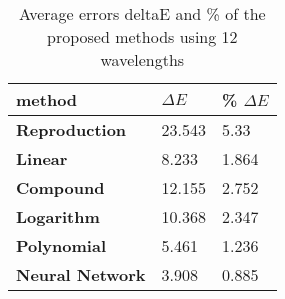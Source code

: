 \begin{table}[H]
  \caption{\label{tab:Average errors of the proposed methods}Average errors deltaE and \% of the proposed methods using 12 wavelengths}
      \begin{tabularx}{\textwidth}{C C C}
    \toprule
      \textbf{method} & \textbf{$\Delta E$} & \textbf{\% $\Delta E$} \\ \midrule
      \textbf{Reproduction} & 23.543 & 5.33\\ 
      \textbf{Linear} & 8.233 & 1.864\\ 
      \textbf{Compound} & 12.155 & 2.752\\ 
      \textbf{Logarithm} & 10.368 & 2.347\\ 
      \textbf{Polynomial} & 5.461 & 1.236\\ 
      \textbf{Neural Network} & 3.908 & 0.885\\ 
    \bottomrule
    \end{tabularx}
\end{table}
